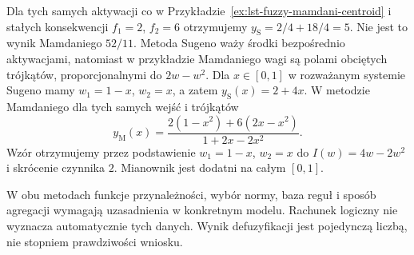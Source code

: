 \begin{przyklad}\label{ex:lst-fuzzy-sugeno-comparison}
Dla tych samych aktywacji co w
Przykładzie~\ref{ex:lst-fuzzy-mamdani-centroid}
i stałych konsekwencji $f_1=2$, $f_2=6$ otrzymujemy
$y_{\mathrm S}=2/4+18/4=5$.
Nie jest to wynik Mamdaniego $52/11$.
Metoda Sugeno waży środki bezpośrednio aktywacjami,
natomiast w przykładzie Mamdaniego wagi są polami
obciętych trójkątów, proporcjonalnymi do $2w-w^2$.
Dla $x\in[0,1]$ w rozważanym systemie Sugeno mamy
$w_1=1-x$, $w_2=x$, a zatem $y_{\mathrm S}(x)=2+4x$.
W metodzie Mamdaniego dla tych samych wejść i trójkątów
\[
 y_{\mathrm M}(x)=
 \frac{2(1-x^2)+6(2x-x^2)}{1+2x-2x^2}.
\]
Wzór otrzymujemy przez podstawienie $w_1=1-x$, $w_2=x$
do $I(w)=4w-2w^2$ i skrócenie czynnika $2$.
Mianownik jest dodatni na całym $[0,1]$.
\begin{center}
\end{center}
\end{przyklad}

\begin{uwaga}\label{rem:ncl-inference-model-choices}
W obu metodach funkcje przynależności, wybór normy,
baza reguł i sposób agregacji wymagają uzasadnienia
w konkretnym modelu. Rachunek logiczny nie wyznacza
automatycznie tych danych. Wynik defuzyfikacji jest
pojedynczą liczbą, nie stopniem prawdziwości wniosku.
\end{uwaga}
